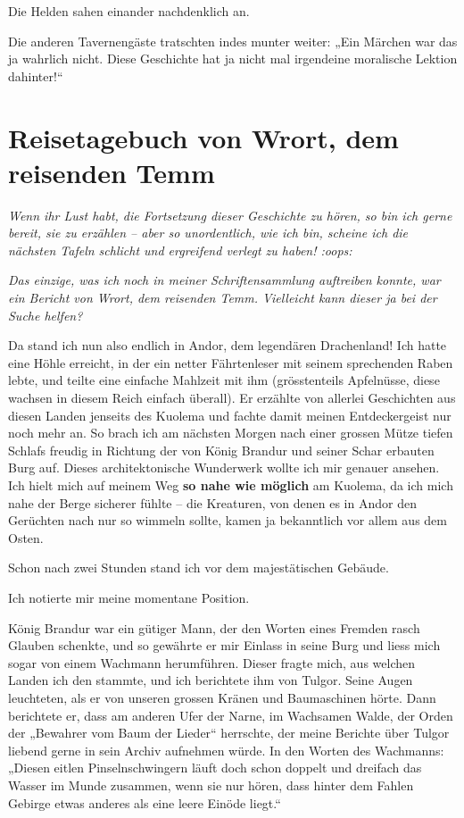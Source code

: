 Die Helden sahen einander nachdenklich an.

Die anderen Tavernengäste tratschten indes munter weiter: „Ein Märchen war das ja wahrlich nicht. Diese Geschichte hat ja nicht mal irgendeine moralische Lektion dahinter!“


\newpage
\section{Reisetagebuch von Wrort, dem reisenden Temm}


\textit{Wenn ihr Lust habt, die Fortsetzung dieser Geschichte zu hören, so bin ich gerne bereit, sie zu erzählen – aber so unordentlich, wie ich bin, scheine ich die nächsten Tafeln schlicht und ergreifend verlegt zu haben! :oops:}

\textit{Das einzige, was ich noch in meiner Schriftensammlung auftreiben konnte, war ein Bericht von Wrort, dem reisenden Temm. Vielleicht kann dieser ja bei der Suche helfen?}



\trennzeichen



Da stand ich nun also endlich in Andor, dem legendären Drachenland! Ich hatte eine Höhle erreicht, in der ein netter Fährtenleser mit seinem sprechenden Raben lebte, und teilte eine einfache Mahlzeit mit ihm (grösstenteils Apfelnüsse, diese wachsen in diesem Reich einfach überall). Er erzählte von allerlei Geschichten aus diesen Landen jenseits des Kuolema und fachte damit meinen Entdeckergeist nur noch mehr an. So brach ich am nächsten Morgen nach einer grossen Mütze tiefen Schlafs freudig in Richtung der von König Brandur und seiner Schar erbauten Burg auf. Dieses architektonische Wunderwerk wollte ich mir genauer ansehen. Ich hielt mich auf meinem Weg \textbf{so nahe wie möglich} am Kuolema, da ich mich nahe der Berge sicherer fühlte – die Kreaturen, von denen es in Andor den Gerüchten nach nur so wimmeln sollte, kamen ja bekanntlich vor allem aus dem Osten.

Schon nach zwei Stunden stand ich vor dem majestätischen Gebäude.

Ich notierte mir meine momentane Position.



\trennzeichen



König Brandur war ein gütiger Mann, der den Worten eines Fremden rasch Glauben schenkte, und so gewährte er mir Einlass in seine Burg und liess mich sogar von einem Wachmann herumführen. Dieser fragte mich, aus welchen Landen ich den stammte, und ich berichtete ihm von Tulgor. Seine Augen leuchteten, als er von unseren grossen Kränen und Baumaschinen hörte. Dann berichtete er, dass am anderen Ufer der Narne, im Wachsamen Walde, der Orden der „Bewahrer vom Baum der Lieder“ herrschte, der meine Berichte über Tulgor liebend gerne in sein Archiv aufnehmen würde. In den Worten des Wachmanns: „Diesen eitlen Pinselnschwingern läuft doch schon doppelt und dreifach das Wasser im Munde zusammen, wenn sie nur hören, dass hinter dem Fahlen Gebirge etwas anderes als eine leere Einöde liegt.“

